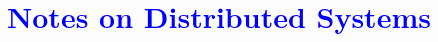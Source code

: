 \documentclass{myproc}
\begin{document}
\small
\title{\large\bf{}\textcolor{blue}{Notes on Distributed Systems}}
\author{}
\date{}
\maketitle
\tableofcontents
\end{document}
